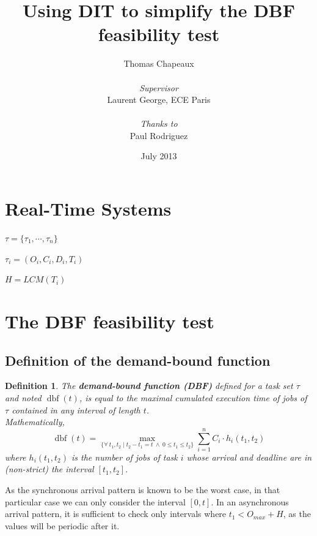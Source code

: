 \documentclass[a4paper,10pt]{article}
\newcommand{\dbf}[1]{\operatorname{dbf}(#1)}
\newtheorem{definition}{Definition}
\begin{document}
\title{Using DIT to simplify the DBF feasibility test}
\author{Thomas Chapeaux \\ ~ \\ \emph{Supervisor} \\ Laurent George, ECE Paris \\ ~ \\ \emph{Thanks to} \\ Paul Rodriguez}

\date{July 2013}

\maketitle

\tableofcontents

\newpage

\section{Real-Time Systems}

$\tau = \{ \tau_1, \cdots, \tau_n \}$

$\tau_i = (O_i, C_i, D_i, T_i)$

$H = LCM(T_i)$

\section{The DBF feasibility test}
\label{sct:DBF}

\subsection{Definition of the demand-bound function}

\begin{definition}
 The \textbf{demand-bound function (DBF)}
 \cite{baruah1999generalized, baruah1990algorithms} defined for a task set
 $\tau$ and noted $\dbf{t}$, is equal to the maximal cumulated execution time of jobs of $\tau$ contained in any interval of length $t$.\\

 Mathematically,
 $$\dbf{t} = \max_{\{\forall \: t_1, t_2 \mid t_2 - t_1 = t \: \wedge \: 0
 \leqslant t_1 \leqslant t_2\}} \sum_{i=1}^n C_i \cdot h_i(t_1, t_2)$$ where
 $h_i(t_1, t_2)$ is the number of jobs of task $i$ whose arrival and deadline are in (non-strict) the interval $[t_1, t_2]$.
\end{definition}

As the synchronous arrival pattern is known to be the worst case, in that particular case we can only consider the interval $[0, t]$. In an asynchronous arrival pattern, it is sufficient to check only intervals where $t_1 < O_{max} + H$, as the values will be periodic after it.\\
\end{document}
